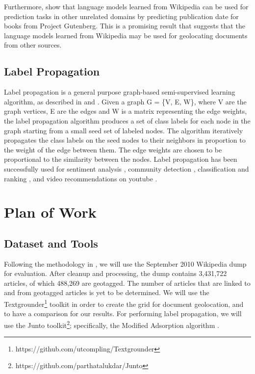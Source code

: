 \documentclass[11pt]{article}
\begin{document}
Furthermore, \cite{kumar-et-al:11} show that language models learned from Wikipedia can be used for prediction tasks in other unrelated domains by predicting publication date for books from Project Gutenberg.
This is a promising result that suggests that the language models learned from Wikipedia may be used for geolocating documents from other sources. 

\subsection{Label Propagation}
Label propagation is a general purpose graph-based semi-supervised learning algorithm, as described in \cite{zhu2002learning} and \cite{talukdar:09}.
Given a graph G = \{V, E, W\}, where V are the graph vertices, E are the edges and W is a matrix representing the edge weights, the label propagation algorithm produces a set of class labels for each node in the graph starting from a small seed set of labeled nodes.
The algorithm iteratively propagates the class labels on the seed nodes to their neighbors in proportion to the weight of the edge between them.
The edge weights are chosen to be proportional to the similarity between the nodes.
Label propagation has been successfully used for sentiment analysis \cite{speriosu2011twitter}, community detection \cite{raghavan2007near}, classification and ranking \cite{talukdar:10}, and video recommendations on youtube \cite{baluja2008video}.



\section{Plan of Work}
\subsection{Dataset and Tools}
Following the methodology in \cite{wing-baldridge:11}, we will use the September 2010 Wikipedia dump for evaluation. 
After cleanup and processing, the dump contains 3,431,722  articles, of which 488,269 are geotagged.
The number of articles that are linked to and from geotagged articles is yet to be determined.
We will use the Textgrounder\footnote{https://github.com/utcompling/Textgrounder} toolkit in order to create the grid for document geolocation, and to have a comparison for our results.
For performing label propagation, we will use the Junto toolkit\footnote{https://github.com/parthatalukdar/Junto}; specifically, the Modified Adsorption algorithm \cite{talukdar:09}.
\end{document}
